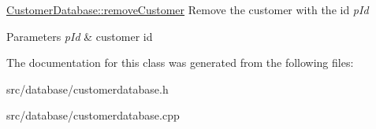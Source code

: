 \hyperlink{classDatabase_1_1CustomerDatabase_ad19fe8efe5e718aba97c9b1a606553c7}{Customer\+Database\+::remove\+Customer} Remove the customer with the id {\itshape p\+Id} 


\begin{DoxyParams}{Parameters}
{\em p\+Id} & customer id \\
\hline
\end{DoxyParams}


The documentation for this class was generated from the following files\+:\begin{DoxyCompactItemize}
\item 
src/database/customerdatabase.\+h\item 
src/database/customerdatabase.\+cpp\end{DoxyCompactItemize}
